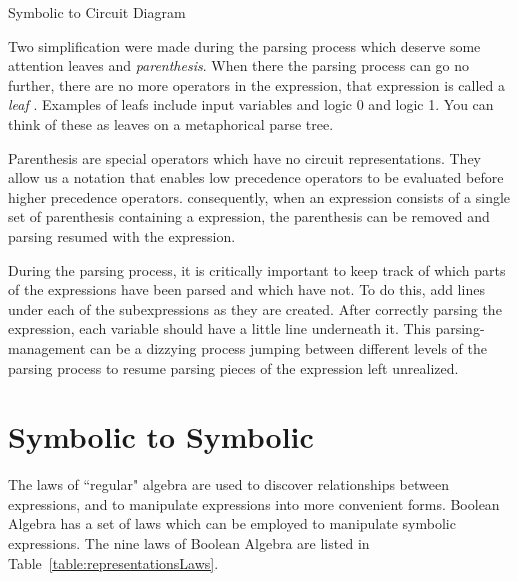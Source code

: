 \begin{process}{Symbolic to Circuit Diagram}
{\setlength{\fboxsep}{0pt}
\centering  
{}
\par}\vspace{0.2cm}
\end{process}

Two simplification were made during the parsing process which deserve some attention
leaves and \textit{parenthesis}.  When there the parsing process can go no
further, there are no more operators in the expression, that expression is called a \textit{leaf} .
Examples of leafs include input variables and logic 0 and logic 1.  You can think of these as leaves on a
metaphorical parse tree.

Parenthesis are special operators which have no circuit representations.  They allow us a notation that
enables low precedence operators to be evaluated before higher precedence operators.
consequently, when an expression consists of a single set of parenthesis containing a 
expression, the parenthesis can be removed and parsing resumed with the expression.  

During the parsing process, it is critically important to keep track of which 
parts of the expressions have been parsed and which have not.  To 
do this, add lines under each of the subexpressions as they are created.
After correctly parsing the expression, each variable should have a little
line underneath it.  This parsing-management can be a dizzying process 
jumping between different levels of the parsing process to resume 
parsing pieces of the expression left unrealized.

\section{Symbolic to Symbolic}
The laws of ``regular" algebra are used to discover relationships
between expressions, and to manipulate expressions into more convenient forms.  
Boolean Algebra has a set of laws which can be employed to manipulate 
symbolic expressions.  The nine laws of Boolean Algebra are listed in 
Table~\ref{table:representationsLaws}.

